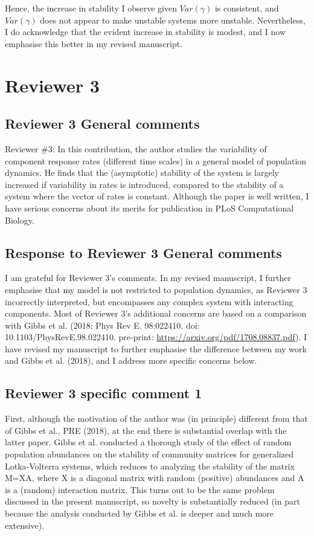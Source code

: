 \documentclass[]{article}
\begin{document}
Hence, the increase in stability I observe given \(Var(\gamma)\) is
consistent, and \(Var(\gamma)\) does not appear to make unstable systems
more unstable. Nevertheless, I do acknowledge that the evident increase
in stability is modest, and I now emphasise this better in my revised
manuscript.

\section{Reviewer 3}\label{reviewer-3}

\subsection{Reviewer 3 General
comments}\label{reviewer-3-general-comments}

Reviewer \#3: In this contribution, the author studies the variability
of component response rates (different time scales) in a general model
of population dynamics. He finds that the (asymptotic) stability of the
system is largely increased if variability in rates is introduced,
compared to the stability of a system where the vector of rates is
constant. Although the paper is well written, I have serious concerns
about its merits for publication in PLoS Computational Biology.

\subsection{Response to Reviewer 3 General
comments}\label{response-to-reviewer-3-general-comments}

I am grateful for Reviewer 3's comments. In my revised manuscript, I
further emphasise that my model is not restricted to population
dynamics, as Reviewer 3 incorrectly interpreted, but encompasses any
complex system with interacting components. Most of Reviewer 3's
additional concerns are based on a comparison with Gibbs et al. (2018;
Phys Rev E. 98:022410. doi: 10.1103/PhysRevE.98.022410. pre-print:
\url{https://arxiv.org/pdf/1708.08837.pdf}). I have revised my
manuscript to further emphasise the difference between my work and Gibbs
et al. (2018), and I address more specific concerns below.

\subsection{Reviewer 3 specific comment
1}\label{reviewer-3-specific-comment-1}

First, although the motivation of the author was (in principle)
different from that of Gibbs et al., PRE (2018), at the end there is
substantial overlap with the latter paper. Gibbs et al. conducted a
thorough study of the effect of random population abundances on the
stability of community matrices for generalized Lotka-Volterra systems,
which reduces to analyzing the stability of the matrix M=XA, where X is
a diagonal matrix with random (positive) abundances and A is a (random)
interaction matrix. This turns out to be the same problem discussed in
the present manuscript, so novelty is substantially reduced (in part
because the analysis conducted by Gibbs et al. is deeper and much more
extensive).
\end{document}
